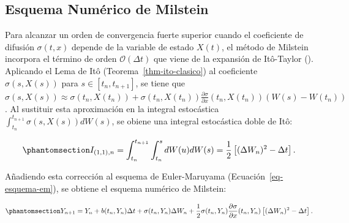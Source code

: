 \documentclass[
  spanish,
  letterpaper,
  DIV=11,
  numbers=noendperiod]{scrreprt}
\theoremstyle{plain}
\theoremstyle{plain}
\theoremstyle{plain}
\theoremstyle{definition}
\theoremstyle{remark}
\begin{document}
\subsection{Esquema Numérico de
Milstein}\label{esquema-numuxe9rico-de-milstein}

Para alcanzar un orden de convergencia fuerte superior cuando el
coeficiente de difusión \(\sigma(t, x)\) depende de la variable de
estado \(X(t)\), el método de Milstein incorpora el término de orden
\(\mathcal{O}(\Delta t)\) que viene de la expansión de Itô-Taylor
(). Aplicando
el Lema de Itô (Teorema~\ref{thm-ito-clasico}) al coeficiente
\(\sigma(s, X(s))\) para \(s \in [t_n, t_{n+1}]\), se tiene que
\(\displaystyle \sigma(s, X(s)) \approx \sigma(t_n, X(t_n)) + \sigma(t_n, X(t_n))\frac{\partial \sigma}{\partial x}(t_n, X(t_n))(W(s) - W(t_n))\).
Al sustituir esta aproximación en la integral estocástica
\(\displaystyle \int_{t_n}^{t_{n+1}} \sigma(s, X(s)) dW(s)\), se obiene
una integral estocástica doble de Itô:

\begin{equation}\phantomsection\label{eq-integral-doble-milstein}{
I_{(1,1), n} = \int_{t_n}^{t_{n+1}} \int_{t_n}^s dW(u) dW(s) = \frac{1}{2}\left[ (\Delta W_n)^2 - \Delta t \right].
}\end{equation}

Añadiendo esta corrección al esquema de Euler-Maruyama
(Ecuación~\ref{eq-esquema-em}), se obtiene el esquema numérico de
Milstein:

\begin{equation}\phantomsection\label{eq-esquema-milstein}{
Y_{n+1} = Y_n + b(t_n, Y_n)\Delta t + \sigma(t_n, Y_n)\Delta W_n + \frac{1}{2}\sigma(t_n, Y_n)\frac{\partial \sigma}{\partial x}(t_n, Y_n)\left[ (\Delta W_n)^2 - \Delta t \right].
}\end{equation}
\end{document}
